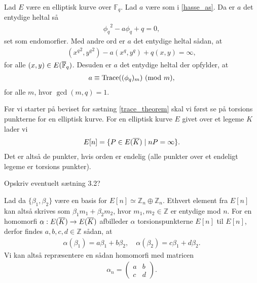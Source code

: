 \begin{theorem}
\label{trace_theorem}
Lad $E$ være en elliptisk kurve over $\mathbb{F}_q$. Lad $a$ være som i \eqref{hasse_as}. Da er $a$ det
entydige heltal så
\begin{align*}
	{\phi_q}^2 - a \phi_q + q = 0,
\end{align*}
set som endomorfier. Med andre ord er $a$ det entydige heltal sådan, at 
\begin{align*}
	({x^q}^2, {y^q}^2) - a(x^q, y^q) + q(x, y) = \infty,
\end{align*}
for alle $(x, y) \in E(\overline{\mathbb{F}}_q)$. Desuden er $a$ det entydige heltal der opfylder, at
\begin{align*}
	a \equiv \text{Trace}((\phi_q)_m) \ (\mathrm{mod} \ m),
\end{align*}
for alle $m$, hvor $\gcd(m, q)=1$.
\end{theorem}

Før vi starter på beviset for sætning \ref{trace_theorem} skal vi først se på torsions punkterne for en elliptisk kurve. For en elliptisk kurve $E$ givet over et legeme $K$ lader vi
\begin{align*}
	E[n] = \{ P \in E(\overline{K}) \mid nP= \infty \}.
\end{align*}
Det er altså de punkter, hvis orden er endelig (alle punkter over et endeligt legeme er torsions punkter). 

Opskriv eventuelt sætning 3.2?

Lad da $\{\beta_1, \beta_2\}$ være en basis for $E[n] \simeq \mathbb{Z}_n \oplus \mathbb{Z}_n$. Ethvert element fra $E[n]$ kan altså skrives som $\beta_1 m_1 + \beta_2 m_2$, hvor $m_1, m_2 \in \mathbb{Z}$ er entydige mod $n$. For en homomorfi $\alpha : E(\overline{K}) \to E(\overline{K})$ afbilleder $\alpha$ torsionspunkterne $E[n]$ til $E[n]$, derfor findes $a, b, c, d \in \mathbb{Z}$ sådan, at 
\begin{align*}
	\alpha(\beta_1) = a \beta_1 + b \beta_2, \quad \alpha(\beta_2) = c\beta_1 + d \beta_2.
\end{align*}
Vi kan altså repræsentere en sådan homomorfi med matricen
\begin{align*}
	\alpha_n = \left( 
	\begin{matrix}
		a & b \\ 
		c & d 
	\end{matrix} \right).
\end{align*}

